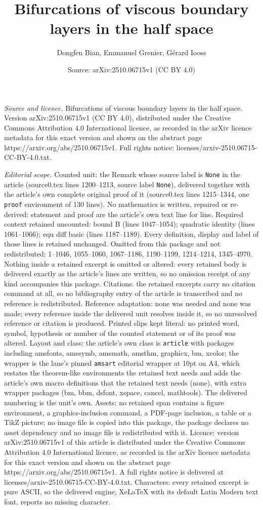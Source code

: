 \documentclass[10pt,a4paper]{amsart}
\title[Bifurcations of viscous boundary layers in the half space]{Bifurcations of viscous boundary layers in the half space}
\author{Dongfen Bian, Emmanuel Grenier, G\'erard Iooss}
\date{Source: arXiv:2510.06715v1 (CC BY 4.0)}
\begin{document}
\maketitle

\noindent\emph{Source and licence.} Bifurcations of viscous boundary layers in the half space. Version arXiv:2510.06715v1 (CC BY 4.0), distributed under the Creative Commons Attribution 4.0 International licence, as recorded in the arXiv licence metadata for this exact version and shown on the abstract page https://arxiv.org/abs/2510.06715v1. Full rights notice: licenses/arxiv-2510.06715-CC-BY-4.0.txt.\par\smallskip

\noindent\textit{Editorial scope.} Counted unit: the Remark whose source label is \texttt{None} in the article (source0.tex lines 1200--1213, source label \texttt{None}), delivered together with the article's own complete original proof of it (source0.tex lines 1215--1344, one \texttt{proof} environment of 130 lines). No mathematics is written, repaired or re-derived: statement and proof are the article's own text line for line. Required context retained uncounted: bound B (lines 1047--1054); quadratic identity (lines 1061--1066); equ diff basic (lines 1187--1189). Every definition, display and label of those lines is retained unchanged. Omitted from this package and not redistributed: 1--1046, 1055--1060, 1067--1186, 1190--1199, 1214--1214, 1345--4970. Nothing inside a retained excerpt is omitted or altered: every retained body is delivered exactly as the article's lines are written, so no omission receipt of any kind accompanies this package. Citations: the retained excerpts carry no citation command at all, so no bibliography entry of the article is transcribed and no reference is redistributed. Reference adaptation: none was needed and none was made; every reference inside the delivered unit resolves inside it, so no unresolved reference or citation is produced. Printed slips kept literal: no printed word, symbol, hypothesis or number of the counted statement or of its proof was altered. Layout and class: the article's own class is \texttt{article} with packages including amsfonts, amssymb, amsmath, amsthm, graphicx, bm, xcolor; the wrapper is the lane's pinned \texttt{amsart} editorial wrapper at 10pt on A4, which restates the theorem-like environments the retained text needs and adds the article's own macro definitions that the retained text needs (none), with extra wrapper packages (bm, bbm, dsfont, xspace, cancel, mathtools). The delivered numbering is the unit's own. Assets: no retained span contains a figure environment, a graphics-inclusion command, a PDF-page inclusion, a table or a TikZ picture; no image file is copied into this package, the package declares no asset dependency and no image file is redistributed with it. Licence: version arXiv:2510.06715v1 of this article is distributed under the Creative Commons Attribution 4.0 International licence, as recorded in the arXiv licence metadata for this exact version and shown on the abstract page https://arxiv.org/abs/2510.06715v1. A full rights notice is delivered at licenses/arxiv-2510.06715-CC-BY-4.0.txt. Characters: every retained excerpt is pure ASCII, so the delivered engine, XeLaTeX with its default Latin Modern text font, reports no missing character.
\end{document}
